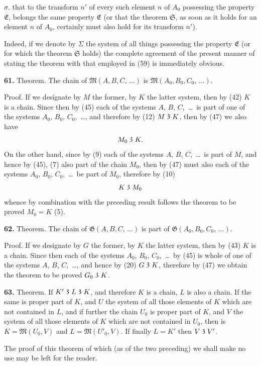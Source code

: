 \documentclass[oneside]{book}
\newcommand\partof{\mathrel{\raisebox{0.45ex}{$\mathfrak{3}$}}}   %
\newcommand\mypara{\medskip\textbf}
\begin{document}
$\sigma$. that to the transform $n'$ of every such element
$n$ of $A_0$ possessing the property $\mathfrak{E}$, belongs the same
property $\mathfrak{E}$ (or that the theorem $\mathfrak{S}$, as soon as it holds
for an element $n$ of $A_0$, certainly must also hold for
its transform $n'$).

Indeed, if we denote by $\Sigma$ the system of all things
possessing the property $\mathfrak{E}$ (or for which the theorem
$\mathfrak{S}$ holds) the complete agreement of the present manner
of stating the theorem with that employed in (59)
is immediately obvious.

\mypara{61.} Theorem.  The chain of $\mathfrak{M}(A, B, C,\, \ldots)$ is
$\mathfrak{M}(A_0,B_0,C_0,\,\ldots)$.

Proof. If we designate by $M$ the former, by $K$
the latter system, then by (42) $K$ is a chain. Since
then by (45) each of the systems $A$, $B$, $C$,~\ldots\ is part
of one of the systems $A_0$, $B_0$, $C_0$,~\ldots, and therefore
by (12) $M \partof K$, then by (47) we also have
\[
M_0 \partof K.
\]
On the other hand, since by (9) each of the systems
$A$, $B$, $C$,~\ldots\ is part of $M$, and hence by (45), (7)
also part of the chain $M_0$, then by (47) must also each
of the systems $A_0$, $B_0$, $C_0$,~\ldots\ be part of $M_0$, therefore
by (10)
\[
K \partof M_0
\]
whence by combination with the preceding result follows
the theorem to be proved $M_0=K$ (5).

\mypara{62.} Theorem. The chain of $\mathfrak{G}(A, B, C,\,\ldots)$ is
part of $\mathfrak{G}(A_0, B_0, C_0,\,\ldots)$.

Proof. If we designate by $G$ the former, by $K$ the
latter system, then by (43) $K$ is a chain. Since then
each of the systems $A_0$, $B_0$, $C_0$,~\ldots\ by (45) is whole
of one of the systems $A$, $B$, $C$,~\ldots, and hence by (20)
$G \partof K$, therefore by (47) we obtain the theorem to be
proved $G_0 \partof K$.

\mypara{63.} Theorem. If $K' \partof L \partof K$, and therefore $K$ is a
chain, $L$ is also a chain.  If the same is proper part
of $K$, and $U$ the system of all those elements of $K$
which are not contained in $L$, and if further the chain
$U_0$ is proper part of $K$, and $V$ the system of all those
elements of $K$ which are not contained in $U_0$, then is
$K=\mathfrak{M}(U_0, V)$ and $L = \mathfrak{M}(U'_0, V)$. If finally $L=K'$
then $V \partof V'$.

The proof of this theorem of which (as of the two
preceding) we shall make no use may be left for the
reader.
\end{document}
